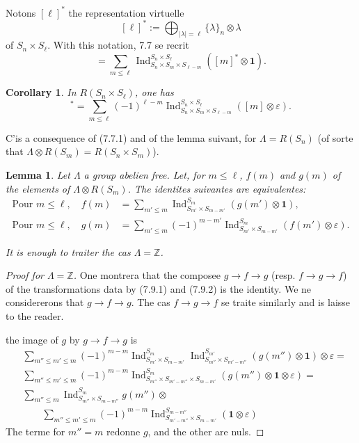 \documentclass[11pt,a4paper]{article}
\theoremstyle{plain}
\newtheorem{lemma}[theorem]{Lemma}
\newtheorem{corollary}[theorem]{Corollary}
\theoremstyle{definition}
\DeclareMathOperator{\Ind}{Ind}
\newcommand{\Z}{\mathbb{Z}}
\newcommand{\eps}{\varepsilon}
\begin{document}
Notons $[\ell]^*$ the representation virtuelle
\[
[\ell]^* := \bigoplus_{|\lambda| = \ell} \{\lambda\}_n \otimes \lambda
\]
of $S_n \times S_\ell$. With this notation, 7.7 se recrit
\begin{equation}
[\ell] = \sum_{m \leq \ell} \Ind_{S_n \times S_m \times S_{\ell-m}}^{S_n \times S_\ell}([m]^* \otimes \mathbf{1}). \tag{7.7.1}
\end{equation}

\begin{corollary}
In $R(S_n \times S_\ell)$, one has
\begin{equation}
[\ell]^* = \sum_{m \leq \ell} (-1)^{\ell-m} \Ind_{S_n \times S_m \times S_{\ell-m}}^{S_n \times S_\ell}([m] \otimes \eps). \tag{7.8.1}
\end{equation}
\end{corollary}

C'is a consequence of (7.7.1) and of the lemma suivant, for $\Lambda = R(S_n)$ (of sorte that $\Lambda \otimes R(S_m) = R(S_n \times S_m)$).

\begin{lemma}
Let $\Lambda$ a group abelien free. Let, for $m \leq \ell$, $f(m)$ and $g(m)$ of the elements of $\Lambda \otimes R(S_m)$. The identites suivantes are equivalentes:
\begin{align}
\text{Pour } m \leq \ell, \quad f(m) &= \sum_{m' \leq m} \Ind_{S_{m'} \times S_{m-m'}}^{S_m}(g(m') \otimes \mathbf{1}), \tag{7.9.1} \\
\text{Pour } m \leq \ell, \quad g(m) &= \sum_{m' \leq m} (-1)^{m-m'} \Ind_{S_{m'} \times S_{m-m'}}^{S_m}(f(m') \otimes \eps). \tag{7.9.2}
\end{align}

It is enough to traiter the cas $\Lambda = \Z$.
\end{lemma}

\begin{proof}[Proof for $\Lambda = \Z$]
One montrera that the composee $g \to f \to g$ (resp. $f \to g \to f$) of the transformations data by (7.9.1) and (7.9.2) is the identity. We ne considererons that $g \to f \to g$. The cas $f \to g \to f$ se traite similarly and is laisse to the reader.

the image of $g$ by $g \to f \to g$ is
\begin{align*}
&\sum_{m'' \leq m' \leq m} (-1)^{m-m} \Ind_{S_{m'} \times S_{m-m'}}^{S_m} \Ind_{S_{m''} \times S_{m'-m''}}^{S_{m'}}(g(m'') \otimes \mathbf{1}) \otimes \eps = \\
&\sum_{m'' \leq m' \leq m} (-1)^{m-m} \Ind_{S_{m''} \times S_{m'-m''} \times S_{m-m'}}^{S_m}(g(m'') \otimes \mathbf{1} \otimes \eps) = \\
&\sum_{m'' \leq m} \Ind_{S_{m''} \times S_{m-m''}}^{S_m} g(m'') \otimes \\
&\qquad \sum_{m'' \leq m' \leq m} (-1)^{m-m} \Ind_{S_{m'-m''} \times S_{m-m'}}^{S_{m-m''}}(\mathbf{1} \otimes \eps)
\end{align*}
The terme for $m'' = m$ redonne $g$, and the other are nuls.
\end{proof}
\end{document}
